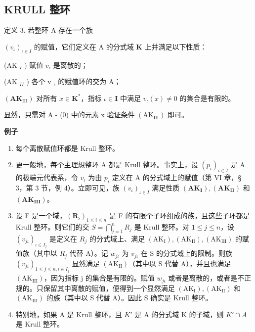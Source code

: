 \subsection{KRULL 整环}

定义 3. 若整环 A 存在一个族

\((v_{\iota})_{\iota\in I}\) 的赋值，它们定义在 A 的分式域 \(\mathbf{K}\) 上并满足以下性质：

(AK \(_{I}\) ) 赋值 \(v_{\iota}\) 是离散的；

(AK \(_{II}\) ) 各个 v \(_{\iota}\) 的赋值环的交为 A；

\((\mathbf{A}\mathbf{K}_{\mathrm{III}})\) 对所有 \(x \in \mathbf{K}^*\)，指标 \(\iota \in \mathbf{I}\) 中满足 \(v_{\iota}(x) \neq 0\) 的集合是有限的。

显然，只需对 A - (0) 中的元素 x 验证条件 \((\mathrm{AK}_{\mathrm{III}})\) 即可。

\textbf{例子}\par

\begin{enumerate}
\def\labelenumi{(\arabic{enumi})}
\item
  每个离散赋值环都是 Krull 整环。
\item
  更一般地，每个主理想整环 A 都是 Krull 整环。事实上，设 \((p_{\iota})_{\iota\in I}\) 是 A 的极端元代表系，令 \(v_{\iota}\) 为由 \(p_{\iota}\) 定义在 A 的分式域上的赋值（第 VI 章，§ 3，第 3 节，例 4）。立即可见，族 \((v_{\iota})_{\iota\in I}\) 满足性质 \((\mathbf{AK}_{\mathbf{I}}), (\mathbf{AK}_{\mathbf{II}})\) 和 \((\mathbf{AK}_{\mathbf{III}})\)。
\item
  设 F 是一个域，\((\mathbf{R}_{i})_{1\leqslant i\leqslant n}\) 是 F 的有限个子环组成的族，且这些子环都是 Krull 整环。则它们的交 \(S=\bigcap_{j=1}^{n}R_{j}\) 是 Krull 整环。对 \(1\leqslant j\leqslant n\)，设 \((v_{j\iota})_{\iota\in I_j}\) 是定义在 \(R_{j}\) 的分式域上、满足 \((\mathrm{AK}_{\mathrm{I}}),(\mathrm{AK}_{\mathrm{II}}),(\mathrm{AK}_{\mathrm{III}})\) 的赋值族（其中以 \(R_{j}\) 代替 A）。记 \(w_{j\iota}\) 为 \(v_{j\iota}\) 在 S 的分式域上的限制。则族 \((v_{j\iota})_{1\leqslant j\leqslant n,\iota\in I_j}\) 显然满足 \((\mathrm{AK}_{\mathrm{II}})\)（其中以 S 代替 A），并且也满足 \((\mathrm{AK}_{\mathrm{III}})\)，因为指标 j 的集合是有限的。赋值 \(w_{j\iota}\) 或者是离散的，或者是不正规的。只保留其中离散的赋值，便得到一个显然满足 \((\mathrm{AK}_{\mathrm{I}}),(\mathrm{AK}_{\mathrm{II}})\) 和 \((\mathrm{AK}_{\mathrm{III}})\) 的族（其中以 S 代替 A）。因此 S 确实是 Krull 整环。
\item
  特别地，如果 A 是 Krull 整环，且 \(K'\) 是 A 的分式域 K 的子域，则 \(K' \cap A\) 是 Krull 整环。
\end{enumerate}

